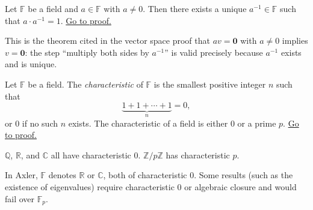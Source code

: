 \begin{proposition}
\label{prop:field-inverse-exists}
Let $\mathbb{F}$ be a field and $a \in \mathbb{F}$ with $a \neq 0$.
Then there exists a unique $a^{-1} \in \mathbb{F}$ such that
$a \cdot a^{-1} = 1$.
\hyperref[prf:field-inverse-exists]{Go to proof.}
\end{proposition}

\begin{remark*}
\end{remark*}




\begin{remark}
This is the theorem cited in the vector space proof that
$av = \mathbf{0}$ with $a \neq 0$ implies $v = \mathbf{0}$:
the step ``multiply both sides by $a^{-1}$'' is valid
precisely because $a^{-1}$ exists and is unique.
\end{remark}

\begin{proposition}
\label{prop:field-characteristic}
Let $\mathbb{F}$ be a field. The \emph{characteristic} of $\mathbb{F}$
is the smallest positive integer $n$ such that
\[
\underbrace{1 + 1 + \cdots + 1}_{n} = 0,
\]
or $0$ if no such $n$ exists.
The characteristic of a field is either $0$ or a prime $p$.
\hyperref[prf:field-characteristic]{Go to proof.}
\end{proposition}

\begin{remark*}
\end{remark*}

\begin{remark}
$\mathbb{Q}$, $\mathbb{R}$, and $\mathbb{C}$ all have characteristic $0$.
$\mathbb{Z}/p\mathbb{Z}$ has characteristic $p$.

In Axler, $\mathbb{F}$ denotes $\mathbb{R}$ or $\mathbb{C}$,
both of characteristic $0$. Some results (such as the existence
of eigenvalues) require characteristic $0$ or algebraic closure
and would fail over $\mathbb{F}_p$.
\end{remark}
